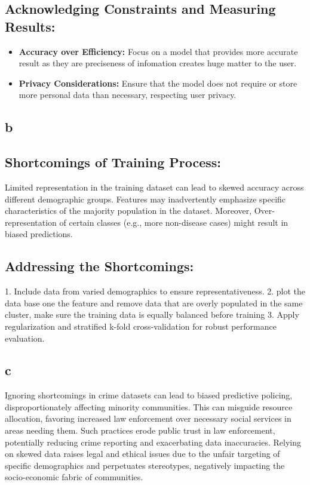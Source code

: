 \subsection*{Acknowledging Constraints and Measuring Results:}

\begin{itemize}
    \item \textbf{Accuracy over Efficiency:} Focus on a model that provides more accurate result as they are preciseness of infomation creates huge matter to the user.
    \item \textbf{Privacy Considerations:} Ensure that the model does not require or store more personal data than necessary, respecting user privacy.
\end{itemize}


\subsection{b}

\subsection*{Shortcomings of Training Process:}

    Limited representation in the training dataset can lead to skewed accuracy across different demographic groups. Features may inadvertently emphasize specific characteristics of the majority population in the dataset.
    Moreover, Over-representation of certain classes (e.g., more non-disease cases) might result in biased predictions.




\subsection*{Addressing the Shortcomings:}
1. Include data from varied demographics to ensure representativeness.
2. plot the data base one the feature and remove data that are overly populated in the same cluster, make sure the training data is equally balanced before training
3. Apply regularization and stratified k-fold cross-validation for robust performance evaluation.

\subsection{c}
Ignoring shortcomings in crime datasets can lead to biased predictive policing, disproportionately affecting minority communities. 
This can misguide resource allocation, favoring increased law enforcement over necessary social services in areas needing them. 
Such practices erode public trust in law enforcement, potentially reducing crime reporting and exacerbating data inaccuracies. 
Relying on skewed data raises legal and ethical issues due to the unfair targeting of specific demographics and perpetuates stereotypes, 
negatively impacting the socio-economic fabric of communities.